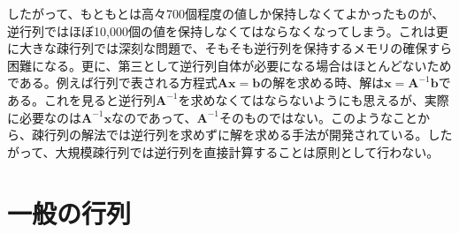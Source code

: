 したがって、もともとは高々700個程度の値しか保持しなくてよかったものが、逆行列ではほぼ10,000個の値を保持しなくてはならなくなってしまう。これは更に大きな疎行列では深刻な問題で、そもそも逆行列を保持するメモリの確保すら困難になる。更に、第三として逆行列自体が必要になる場合はほとんどないためである。例えば行列で表される方程式\(\boldsymbol{A}\boldsymbol{x}=\boldsymbol{b}\)の解を求める時、解は\(\boldsymbol{x}=\boldsymbol{A}^{-1}\boldsymbol{b}\)である。これを見ると逆行列\(\boldsymbol{A}^{-1}\)を求めなくてはならないようにも思えるが、実際に必要なのは\(\boldsymbol{A}^{-1}\boldsymbol{x}\)なのであって、\(\boldsymbol{A}^{-1}\)そのものではない。このようなことから、疎行列の解法では逆行列を求めずに解を求める手法が開発されている。したがって、大規模疎行列では逆行列を直接計算することは原則として行わない。

\section{一般の行列}
